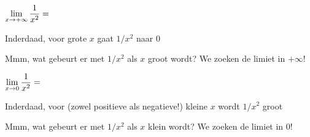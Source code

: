 \documentclass{ximera}
\begin{document}
\begin{exercise}
		\begin{question} 
			{\reversemarginpar\marginpar{\Smiley}}
			\def\isC{correct}   $\limxi    \frac{1}{x^2}= \;$   \localoefoptions 
			\begin{feedback}[correct]Inderdaad, voor grote $x$  gaat $1/x^2$ naar $0$\end{feedback}	
			\begin{feedback}[false]Mmm, wat gebeurt er met $1/x^2$ als $x$ groot wordt? We zoeken de limiet in $+\infty$!\end{feedback}
		\end{question}
		\begin{question} \def\isA{correct}   $\limx     \frac{1}{x^2}= \;$   \localoefoptions 
			\begin{feedback}[correct]Inderdaad, voor (zowel positieve als negatieve!) kleine $x$ wordt $1/x^2$ groot \end{feedback}	
			\begin{feedback}[1==0]Mmm, wat gebeurt er met $1/x^2$ als $x$ klein wordt? We zoeken de limiet in $0$!\end{feedback}
		\end{question}


\end{exercise}
\end{document}
